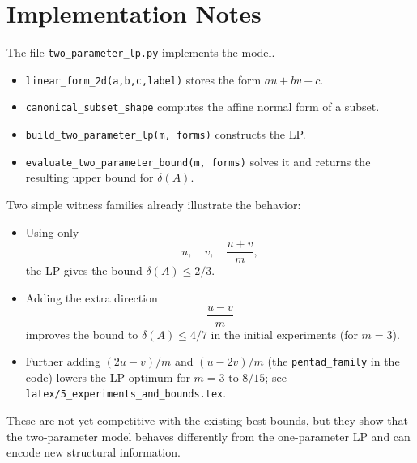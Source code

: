 \documentclass[11pt]{article}
\begin{document}
\section{Implementation Notes}

The file \texttt{two\_parameter\_lp.py} implements the model.

\begin{itemize}
\item \texttt{linear\_form\_2d(a,b,c,label)} stores the form $au+bv+c$.
\item \texttt{canonical\_subset\_shape} computes the affine normal form of a subset.
\item \texttt{build\_two\_parameter\_lp(m, forms)} constructs the LP.
\item \texttt{evaluate\_two\_parameter\_bound(m, forms)} solves it and returns the
resulting upper bound for $\delta(A)$.
\end{itemize}

Two simple witness families already illustrate the behavior:

\begin{itemize}
\item Using only
\[
u,\quad v,\quad \frac{u+v}{m},
\]
the LP gives the bound $\delta(A)\leq 2/3$.
\item Adding the extra direction
\[
\frac{u-v}{m}
\]
improves the bound to $\delta(A)\leq 4/7$ in the initial experiments (for $m=3$).
\item Further adding $(2u-v)/m$ and $(u-2v)/m$ (the \texttt{pentad\_family} in the
code) lowers the LP optimum for $m=3$ to $8/15$; see \texttt{latex/5\_experiments\_and\_bounds.tex}.
\end{itemize}

These are not yet competitive with the existing best bounds, but they show that the
two-parameter model behaves differently from the one-parameter LP and can encode
new structural information.
\end{document}
